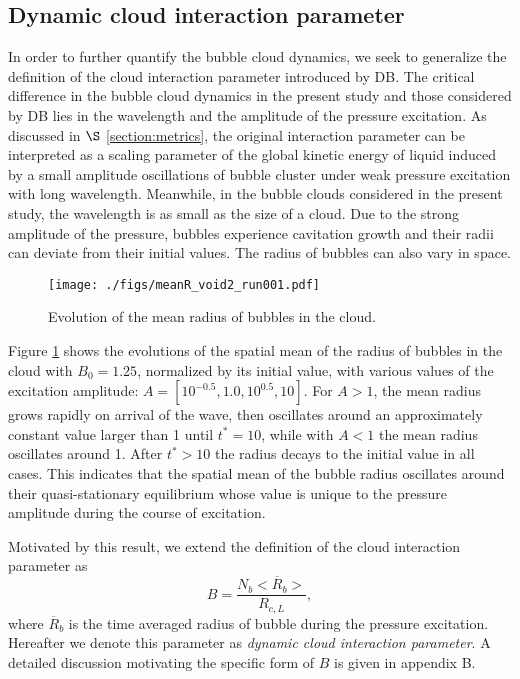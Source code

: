 \documentclass{jfm}
\begin{document}
\subsection{Dynamic cloud interaction parameter}
\label{section:dynamicB}
In order to further quantify the bubble cloud dynamics, we seek to generalize the definition of the cloud interaction parameter introduced by DB.
The critical difference in the bubble cloud dynamics in the present study and those considered by DB lies in the wavelength and the amplitude of the pressure excitation.
As discussed in $\S$ \ref{section:metrics}, the original interaction parameter can be interpreted as a scaling parameter of the global kinetic energy of liquid induced by a small amplitude oscillations of bubble cluster under weak pressure excitation with long wavelength.
Meanwhile, in the bubble clouds considered in the present study, the wavelength is as small as the size of a cloud.
Due to the strong amplitude of the pressure, bubbles experience cavitation growth and their radii can deviate from their initial values.
The radius of bubbles can also vary in space.

\begin{figure}
  \center
  \texttt{[image: ./figs/meanR\_void2\_run001.pdf]}
  \caption{Evolution of the mean radius of bubbles in the cloud.}
   \label{fig:meanRv2} 
\end{figure}
Figure \ref{fig:meanRv2} shows the evolutions of the spatial mean of the radius of bubbles in the cloud with $B_0=1.25$, normalized by its initial value, with various values of the excitation amplitude: $A=[10^{-0.5},1.0,10^{0.5},10]$.
For $A>1$, the mean radius grows rapidly on arrival of the wave, then oscillates around an approximately constant value larger than 1 until $t^*=10$, while with $A<1$ the mean radius oscillates around 1.
After $t^*>10$ the radius decays to the initial value in all cases.
This indicates that the spatial mean of the bubble radius oscillates around their quasi-stationary equilibrium whose value is unique to the pressure amplitude during the course of excitation.

Motivated by this result, we extend the definition of the cloud interaction parameter as
\begin{equation}
B=\frac{N_b<\overline{R}_b>}{R_{c,L}},
\end{equation}
where
$\overline{R}_{b}$ is the time averaged radius of bubble during the pressure excitation.
Hereafter we denote this parameter as {\it{dynamic cloud interaction parameter}}.
A detailed discussion motivating the specific form of $B$ is given in appendix B.
\end{document}
